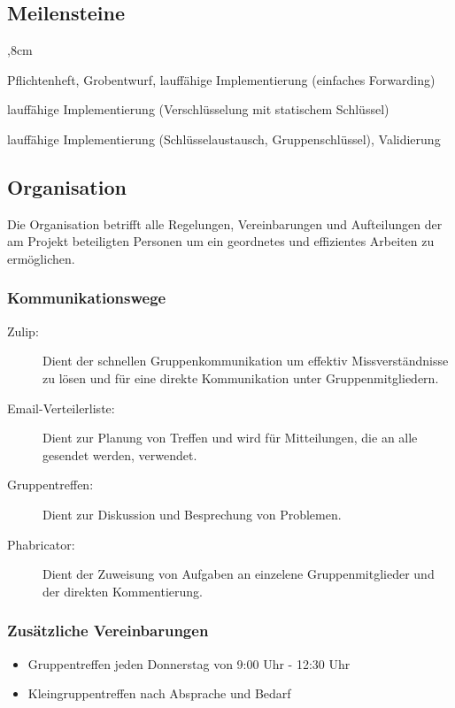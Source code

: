 \documentclass[a4paper, 11pt, ngerman, fleqn]{article}
\begin{document}
\clearpage
	
\subsection{Meilensteine}
	\begin{description}
	,8cm
		\item[Erster Meilenstein:] Pflichtenheft, Grobentwurf, lauffähige Implementierung (einfaches Forwarding)
		
		\item[Zweiter Meilenstein:] lauffähige Implementierung (Verschlüsselung mit statischem Schlüssel)
		
		\item[Dritter Meilenstein:] lauffähige Implementierung (Schlüsselaustausch, Gruppenschlüssel), Validierung
	\end{description}
	

	 
\subsection{Organisation}

Die Organisation betrifft alle Regelungen, Vereinbarungen und Aufteilungen der am Projekt beteiligten Personen um ein geordnetes und effizientes Arbeiten zu ermöglichen.
	
\subsubsection{Kommunikationswege}
	\begin{description}
		\item[Zulip:] Dient der schnellen Gruppenkommunikation um effektiv Missverständnisse zu lösen und für eine direkte Kommunikation unter Gruppenmitgliedern.
		
		\item[Email-Verteilerliste:] Dient zur Planung von Treffen und wird für Mitteilungen, die an alle gesendet werden, verwendet.
		
		\item[Gruppentreffen:] Dient zur Diskussion und Besprechung von Problemen. 
		
		\item[Phabricator:] Dient der Zuweisung von Aufgaben an einzelene Gruppenmitglieder und der direkten Kommentierung.
		
	\end{description}
		
\subsubsection{Zusätzliche Vereinbarungen}
	\begin{itemize}
		\item Gruppentreffen jeden Donnerstag von 9:00 Uhr - 12:30 Uhr
		
		\item Kleingruppentreffen nach Absprache und Bedarf
		
	\end{itemize}
		
\end{document}
